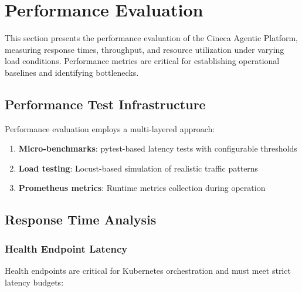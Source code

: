 
\section{Performance Evaluation}
\label{sec:performance-eval}

This section presents the performance evaluation of the Cineca Agentic Platform, measuring response times, throughput, and resource utilization under varying load conditions. Performance metrics are critical for establishing operational baselines and identifying bottlenecks.

\subsection{Performance Test Infrastructure}

Performance evaluation employs a multi-layered approach:

\begin{enumerate}
    \item \textbf{Micro-benchmarks}: pytest-based latency tests with configurable thresholds
    \item \textbf{Load testing}: Locust-based simulation of realistic traffic patterns
    \item \textbf{Prometheus metrics}: Runtime metrics collection during operation
\end{enumerate}

\subsection{Response Time Analysis}

\subsubsection{Health Endpoint Latency}

Health endpoints are critical for Kubernetes orchestration and must meet strict latency budgets:

